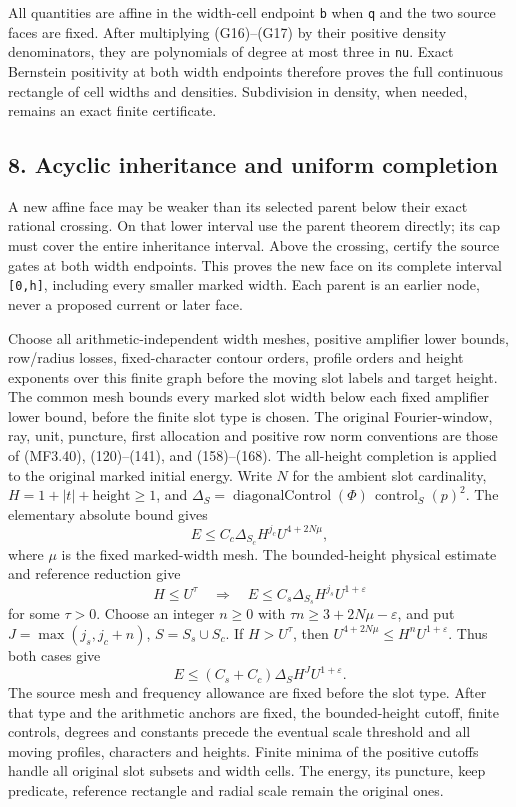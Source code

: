 All quantities are affine in the width-cell endpoint \texttt{b} when \texttt{q} and the two source faces are fixed. After multiplying (G16)--(G17) by their positive density denominators, they are polynomials of degree at most three in \texttt{nu}. Exact Bernstein positivity at both width endpoints therefore proves the full continuous rectangle of cell widths and densities. Subdivision in density, when needed, remains an exact finite certificate.

\hypertarget{sources:acyclic-inheritance-and-uniform-completion}{%
\subsection{8. Acyclic inheritance and uniform completion}\label{sources:acyclic-inheritance-and-uniform-completion}}

A new affine face may be weaker than its selected parent below their exact rational crossing. On that lower interval use the parent theorem directly; its cap must cover the entire inheritance interval. Above the crossing, certify the source gates at both width endpoints. This proves the new face on its complete interval \texttt{{[}0,h{]}}, including every smaller marked width. Each parent is an earlier node, never a proposed current or later face.

Choose all arithmetic-independent width meshes, positive amplifier lower bounds, row/radius losses, fixed-character contour orders, profile orders and height exponents over this finite graph before the moving slot labels and target height. The common mesh bounds every marked slot width below each fixed amplifier lower bound, before the finite slot type is chosen. The original Fourier-window, ray, unit, puncture, first allocation and positive row norm conventions are those of (MF3.40), (120)--(141), and (158)--(168). The all-height completion is applied to the original marked initial
energy. Write \(N\) for the ambient slot cardinality,
\(H=1+|t|+\mathrm{height}\ge1\), and
\(\Delta_S=\operatorname{diagonalControl}(\Phi)\,
\operatorname{control}_S(p)^2\). The elementary absolute bound gives
\[
 E\le C_c\Delta_{S_c}H^{j_c}U^{4+2N\mu},
\]
where \(\mu\) is the fixed marked-width mesh. The bounded-height
physical estimate and reference reduction give
\[
 H\le U^\tau\quad\Longrightarrow\quad
 E\le C_s\Delta_{S_s}H^{j_s}U^{1+\varepsilon}
\]
for some \(\tau>0\). Choose an integer \(n\ge0\) with
\(\tau n\ge3+2N\mu-\varepsilon\), and put
\(J=\max(j_s,j_c+n)\), \(S=S_s\cup S_c\).
If \(H>U^\tau\), then
\(U^{4+2N\mu}\le H^nU^{1+\varepsilon}\). Thus both cases give
\[
 E\le(C_s+C_c)\Delta_S H^J U^{1+\varepsilon}.
\]
The source mesh and frequency allowance are fixed before the slot type.
After that type and the arithmetic anchors are fixed, the bounded-height
cutoff, finite controls, degrees and constants precede the eventual
scale threshold and all moving profiles, characters and heights.
Finite minima of the positive cutoffs handle all original slot subsets
and width cells. The energy, its puncture, keep predicate, reference
rectangle and radial scale remain the original ones.

